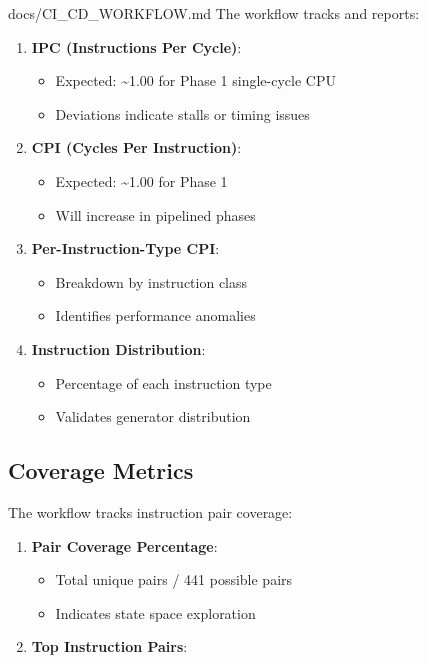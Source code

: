 \begin{relocated}{docs/CI_CD_WORKFLOW.md}
The workflow tracks and reports:

\begin{enumerate}
\def\labelenumi{\arabic{enumi}.}
\item
  \textbf{IPC (Instructions Per Cycle)}:

  \begin{itemize}
  \tightlist
  \item
    Expected: \textasciitilde1.00 for Phase 1 single-cycle CPU
  \item
    Deviations indicate stalls or timing issues
  \end{itemize}
\item
  \textbf{CPI (Cycles Per Instruction)}:

  \begin{itemize}
  \tightlist
  \item
    Expected: \textasciitilde1.00 for Phase 1
  \item
    Will increase in pipelined phases
  \end{itemize}
\item
  \textbf{Per-Instruction-Type CPI}:

  \begin{itemize}
  \tightlist
  \item
    Breakdown by instruction class
  \item
    Identifies performance anomalies
  \end{itemize}
\item
  \textbf{Instruction Distribution}:

  \begin{itemize}
  \tightlist
  \item
    Percentage of each instruction type
  \item
    Validates generator distribution
  \end{itemize}
\end{enumerate}

\subsection{Coverage Metrics}\label{um:flow:ci-cd-workflow:coverage-metrics}

The workflow tracks instruction pair coverage:

\begin{enumerate}
\def\labelenumi{\arabic{enumi}.}
\item
  \textbf{Pair Coverage Percentage}:

  \begin{itemize}
  \tightlist
  \item
    Total unique pairs / 441 possible pairs
  \item
    Indicates state space exploration
  \end{itemize}
\item
  \textbf{Top Instruction Pairs}:


\end{enumerate}
\end{relocated}

